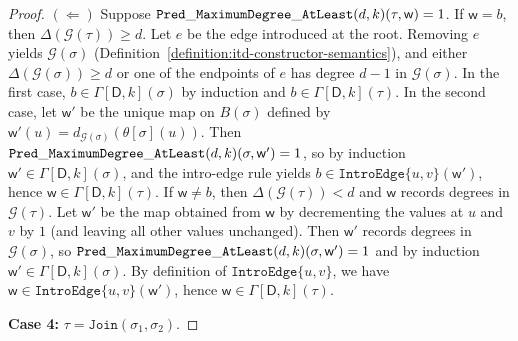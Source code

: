 \documentclass[11pt,a4paper]{article}
\newcommand{\truevalue}{1}
\newcommand{\treewidthvalue}{k}
\newcommand{\decompositiongraph}[1]{\mathcal{G}(#1)}
\newcommand{\maxDegree}{\Delta}
\newcommand{\anedge}{e}
\newcommand{\jointype}{\mathtt{Join}}
\newcommand{\introedgegeneric}[2]{\mathtt{IntroEdge}\{#1,#2\}}
\newcommand{\topbagname}{B}
\newcommand{\topbag}[1]{\topbagname(#1)}
\newcommand{\abstractdecomposition}{\tau}
\newcommand{\sigmaabstractdecomposition}{\sigma}
\newcommand{\vertexone}{u}
\newcommand{\vertextwo}{v}
\newcommand{\awitness}{\mathsf{w}}
\newcommand{\dpcore}{\mathsf{D}}
\newcommand{\dpNamePart}[1]{\mbox{\normalfont\ttfamily #1}}
\newcommand{\predicateMaxDegree}[2]{\dpNamePart{Pred}\_\allowbreak\dpNamePart{MaximumDegree}\_\allowbreak\dpNamePart{AtLeast}(#1,#2)}
\newcommand{\topmapname}{\theta}
\newcommand{\topmap}[1]{\topmapname[#1]}
\newcommand{\dynamizationfunctionname}[1]{\Gamma[{#1}]}
\newcommand{\dynamizationfunction}[2]{\dynamizationfunctionname{#1,#2}}
\newcommand{\maxdegreeparameter}{d}
\newcommand{\maxdegreefound}{b}
\newcommand{\mxdp}{\predicateMaxDegree{\maxdegreeparameter}{\treewidthvalue}}
\begin{document}
{\begin{proof}
$(\Leftarrow)$ Suppose $\mxdp(\abstractdecomposition,\awitness)=\truevalue$. If $\awitness=\maxdegreefound$, then $\maxDegree(\decompositiongraph{\abstractdecomposition})\ge \maxdegreeparameter$. Let $\anedge$ be the edge introduced at the root. Removing $\anedge$ yields $\decompositiongraph{\sigmaabstractdecomposition}$ (Definition~\ref{definition:itd-constructor-semantics}), and either $\maxDegree(\decompositiongraph{\sigmaabstractdecomposition})\ge \maxdegreeparameter$ or one of the endpoints of $\anedge$ has degree $\maxdegreeparameter-1$ in $\decompositiongraph{\sigmaabstractdecomposition}$. In the first case, $\maxdegreefound\in \dynamizationfunction{\dpcore}{\treewidthvalue}(\sigmaabstractdecomposition)$ by induction and $\maxdegreefound\in \dynamizationfunction{\dpcore}{\treewidthvalue}(\abstractdecomposition)$. In the second case, let $\awitness'$ be the unique map on $\topbag{\sigmaabstractdecomposition}$ defined by $\awitness'(u)=d_{\decompositiongraph{\sigmaabstractdecomposition}}(\topmap{\sigmaabstractdecomposition}(u))$. Then $\mxdp(\sigmaabstractdecomposition,\awitness')=\truevalue$, so by induction $\awitness'\in \dynamizationfunction{\dpcore}{\treewidthvalue}(\sigmaabstractdecomposition)$, and the intro-edge rule yields $\maxdegreefound\in \introedgegeneric{\vertexone}{\vertextwo}(\awitness')$, hence $\awitness\in \dynamizationfunction{\dpcore}{\treewidthvalue}(\abstractdecomposition)$. If $\awitness\neq \maxdegreefound$, then $\maxDegree(\decompositiongraph{\abstractdecomposition})<\maxdegreeparameter$ and $\awitness$ records degrees in $\decompositiongraph{\abstractdecomposition}$. Let $\awitness'$ be the map obtained from $\awitness$ by decrementing the values at $\vertexone$ and $\vertextwo$ by $1$ (and leaving all other values unchanged). Then $\awitness'$ records degrees in $\decompositiongraph{\sigmaabstractdecomposition}$, so $\mxdp(\sigmaabstractdecomposition,\awitness')=\truevalue$ and by induction $\awitness'\in \dynamizationfunction{\dpcore}{\treewidthvalue}(\sigmaabstractdecomposition)$. By definition of $\introedgegeneric{\vertexone}{\vertextwo}$, we have $\awitness\in \introedgegeneric{\vertexone}{\vertextwo}(\awitness')$, hence $\awitness\in \dynamizationfunction{\dpcore}{\treewidthvalue}(\abstractdecomposition)$.

\medskip
\noindent\textbf{Case 4:} $\abstractdecomposition=\jointype(\sigmaabstractdecomposition_1,\sigmaabstractdecomposition_2)$.


\end{proof}}
\end{document}
